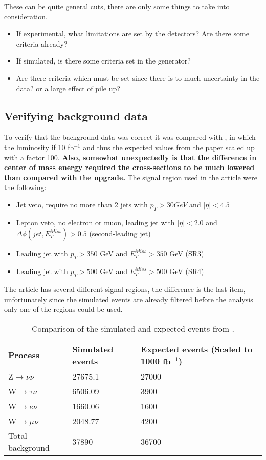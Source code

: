 These can be quite general cuts, there are only some things to take into consideration. 
\begin{itemize}
\item If experimental, what limitations are set by the detectors? Are there some criteria already?
\item If simulated, is there some criteria set in the generator?
\item Are there criteria which must be set since there is to much uncertainty in the data? or a large effect of pile up?
\end{itemize}


\subsection{Verifying background data} 	
To verify that the background data was correct it was compared with \citep{ATLAS-CONF-2012-147}, in which the luminosity if 10 fb$^{-1}$ and thus the expected values from the paper scaled up with a factor 100. \textbf{Also, somewhat unexpectedly is that the difference in center of mass energy required the cross-sections to be much lowered than compared with the upgrade.} The signal region used in the article were the following:
\begin{itemize}
\item Jet veto, require no more than 2 jets with $p_T > 30 GeV$ and $|\eta| < 4.5$
\item Lepton veto, no electron or muon, leading jet with $|\eta| < 2.0$ and $\Delta \phi (jet, E_T^{Miss})>0.5$ (second-leading jet)
\item Leading jet with $p_T > 350$ GeV and $E_T^{Miss}>350$ GeV (SR3)
\item Leading jet with $p_T > 500$ GeV and $E_T^{Miss}>500$ GeV (SR4)
\end{itemize}
The article has several different signal regions, the difference is the last item, unfortunately since the simulated events are already filtered before the analysis only one of the regions could be used.
\begin{table}[ht]
\begin{center}
\begin{tabular}{|l|l|l|}
\hline
Process & Simulated events & Expected events (Scaled to 1000 fb$^{-1}$) \\ \hline
Z$\rightarrow\nu\nu$&27675.1&27000 \\
W$\rightarrow\tau\nu$&6506.09&3900 \\
W$\rightarrow e\nu$&1660.06&1600 \\
W$\rightarrow\mu\nu$&2048.77&4200 \\ \hline
Total background&37890&36700 \\ \hline
\end{tabular}
\caption{Comparison of the simulated and expected events from \citep{ATLAS-CONF-2012-147}.}
\label{tab:Compare1}
\end{center}
\end{table}

